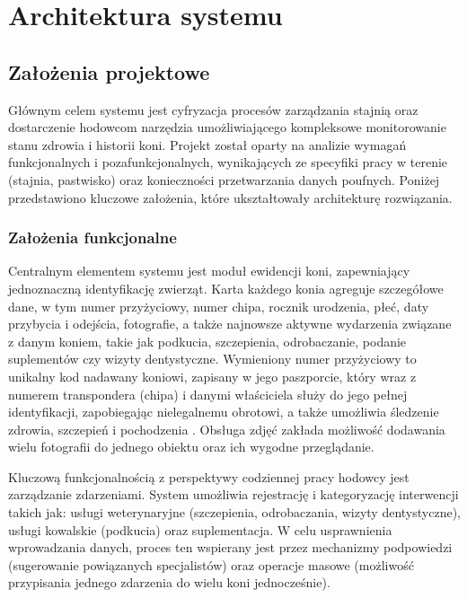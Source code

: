 \chapter{Architektura systemu}
\label{chapters:03-architektura}

\section{Założenia projektowe}

Głównym celem systemu  jest cyfryzacja procesów zarządzania stajnią oraz dostarczenie hodowcom narzędzia umożliwiającego kompleksowe monitorowanie stanu zdrowia i historii koni. Projekt został oparty na analizie wymagań funkcjonalnych i pozafunkcjonalnych, wynikających ze specyfiki pracy w terenie (stajnia, pastwisko) oraz konieczności przetwarzania danych poufnych. Poniżej przedstawiono kluczowe założenia, które ukształtowały architekturę rozwiązania.

\subsection{Założenia funkcjonalne}

Centralnym elementem systemu jest moduł ewidencji koni, zapewniający jednoznaczną identyfikację zwierząt. Karta każdego konia agreguje szczegółowe dane, w tym numer przyżyciowy, numer chipa, rocznik urodzenia, płeć, daty przybycia i odejścia, fotografie, a także najnowsze aktywne wydarzenia związane z danym koniem, takie jak podkucia, szczepienia, odrobaczanie, podanie suplementów czy wizyty dentystyczne. Wymieniony numer przyżyciowy to unikalny kod nadawany koniowi, zapisany w jego paszporcie, który wraz z numerem transpondera (chipa) i danymi właściciela służy do jego pełnej identyfikacji, zapobiegając nielegalnemu obrotowi, a także umożliwia śledzenie zdrowia, szczepień i pochodzenia \cite{pzhk_passport}. Obsługa zdjęć zakłada możliwość dodawania wielu fotografii do jednego obiektu oraz ich wygodne przeglądanie.

Kluczową funkcjonalnością z perspektywy codziennej pracy hodowcy jest zarządzanie zdarzeniami. System umożliwia rejestrację i kategoryzację interwencji takich jak: usługi weterynaryjne (szczepienia, odrobaczania, wizyty dentystyczne), usługi kowalskie (podkucia) oraz suplementacja. W celu usprawnienia wprowadzania danych, proces ten wspierany jest przez mechanizmy podpowiedzi (sugerowanie powiązanych specjalistów) oraz operacje masowe (możliwość przypisania jednego zdarzenia do wielu koni jednocześnie).

